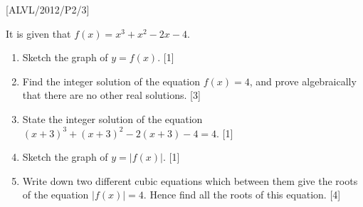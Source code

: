 \item {[}ALVL/2012/P2/3{]}

It is given that $f\left(x\right)=x^{3}+x^{2}-2x-4$. 
\begin{enumerate}
\item Sketch the graph of $y=f\left(x\right)$. {[}1{]} 
\item Find the integer solution of the equation $f\left(x\right)=4$, and
prove algebraically that there are no other real solutions. {[}3{]} 
\item State the integer solution of the equation $\left(x+3\right)^{3}+\left(x+3\right)^{2}-2\left(x+3\right)-4=4$.
{[}1{]} 
\item Sketch the graph of $y=\left|f\left(x\right)\right|$. {[}1{]} 
\item Write down two different cubic equations which between them give the
roots of the equation $\left|f\left(x\right)\right|=4$. Hence find
all the roots of this equation. {[}4{]}
\end{enumerate}
